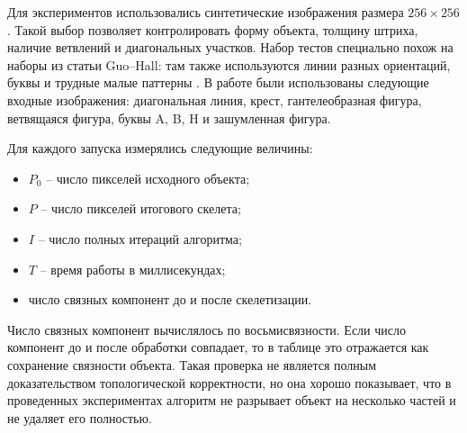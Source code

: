 \documentclass[12pt,a4paper]{article}
\begin{document}
	Для экспериментов использовались синтетические изображения размера $256\times256$. Такой выбор позволяет контролировать форму объекта, толщину штриха, наличие ветвлений и диагональных участков. Набор тестов специально похож на наборы из статьи Guo--Hall: там также используются линии разных ориентаций, буквы и трудные малые паттерны \cite{guo1989}. В работе были использованы следующие входные изображения: диагональная линия, крест, гантелеобразная фигура, ветвящаяся фигура, буквы A, B, H и зашумленная фигура.
	
	Для каждого запуска измерялись следующие величины:
	
	\begin{itemize}
	    \item $P_0$ -- число пикселей исходного объекта;
	    \item $P$ -- число пикселей итогового скелета;
	    \item $I$ -- число полных итераций алгоритма;
	    \item $T$ -- время работы в миллисекундах;
	    \item число связных компонент до и после скелетизации.
	\end{itemize}
	
	Число связных компонент вычислялось по восьмисвязности. Если число компонент до и после обработки совпадает, то в таблице это отражается как сохранение связности объекта. Такая проверка не является полным доказательством топологической корректности, но она хорошо показывает, что в проведенных экспериментах алгоритм не разрывает объект на несколько частей и не удаляет его полностью.
	
\end{document}
